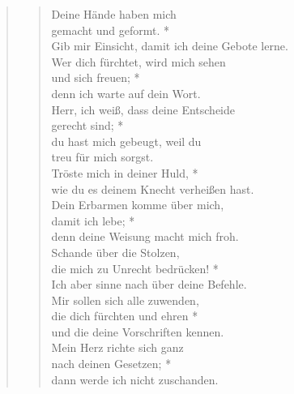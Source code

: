 \begin{quote}
\begin{verse}
Deine Hände haben mich\\
gemacht und geformt. *\\
Gib mir Einsicht, damit ich deine Gebote lerne.\\ 
\vin Wer dich fürchtet, wird mich sehen\\ 
\vin und sich freuen; *\\ 
\vin denn ich warte auf dein Wort.\\ 
Herr, ich weiß, dass deine Entscheide\\
gerecht sind; *\\
du hast mich gebeugt, weil du\\
treu für mich sorgst.\\ 
\vin Tröste mich in deiner Huld, *\\ 
\vin wie du es deinem Knecht verheißen hast.\\ 
Dein Erbarmen komme über mich,\\
damit ich lebe; *\\
denn deine Weisung macht mich froh.\\ 
\vin Schande über die Stolzen, \\ 
\vin die mich zu Unrecht bedrücken! *\\ 
\vin Ich aber sinne nach über deine Befehle.\\ 
Mir sollen sich alle zuwenden,\\
die dich fürchten und ehren *\\
und die deine Vorschriften kennen.\\ 
\vin Mein Herz richte sich ganz \\ 
\vin nach deinen Gesetzen; *\\ 
\vin dann werde ich nicht zuschanden.\\        
\end{verse}
\end{quote}                







